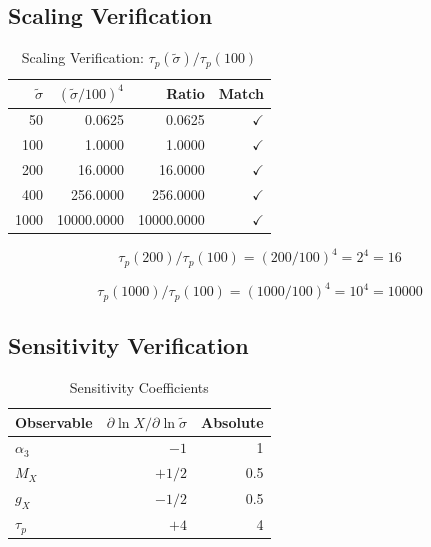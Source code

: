 \documentclass[11pt,letterpaper]{article}
\newcommand{\st}{\tilde{\sigma}}
\begin{document}
\subsection{Scaling Verification}
\label{app:scaling-table}

\begin{table}[h!]
\centering
\caption{Scaling Verification: $\tau_p(\st) / \tau_p(100)$}
\label{tab:scaling-verify}
\begin{tabular}{rrrr}
\toprule
$\st$ & $(\st/100)^4$ & Ratio & Match \\
\midrule
50 & 0.0625 & 0.0625 & $\checkmark$ \\
100 & 1.0000 & 1.0000 & $\checkmark$ \\
200 & 16.0000 & 16.0000 & $\checkmark$ \\
400 & 256.0000 & 256.0000 & $\checkmark$ \\
1000 & 10000.0000 & 10000.0000 & $\checkmark$ \\
\bottomrule
\end{tabular}
\end{table}

\begin{equation}
\tau_p(200) / \tau_p(100) = (200/100)^4 = 2^4 = 16
\label{eq:scaling-verify-200}
\end{equation}

\begin{equation}
\tau_p(1000) / \tau_p(100) = (1000/100)^4 = 10^4 = 10000
\label{eq:scaling-verify-1000}
\end{equation}

\subsection{Sensitivity Verification}
\label{app:sensitivity-table}

\begin{table}[h!]
\centering
\caption{Sensitivity Coefficients}
\label{tab:sensitivity}
\begin{tabular}{lrr}
\toprule
Observable & $\partial \ln X / \partial \ln \st$ & Absolute \\
\midrule
$\alpha_3$ & $-1$ & 1 \\
$M_X$ & $+1/2$ & 0.5 \\
$g_X$ & $-1/2$ & 0.5 \\
$\tau_p$ & $+4$ & 4 \\
\bottomrule
\end{tabular}
\end{table}
\end{document}
